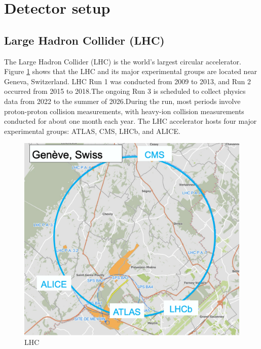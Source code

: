\newpage
\clearpage
\section{Detector setup}
    \subsection{Large Hadron Collider (LHC)}
        The Large Hadron Collider (LHC) is the world's largest circular accelerator. Figure \ref{LHC} shows that the LHC and its major experimental groups are located near Geneva, Switzerland. LHC Run 1 was conducted from 2009 to 2013, and Run 2 occurred from 2015 to 2018.\@ The ongoing Run 3 is scheduled to collect physics data from 2022 to the summer of 2026.\@ During the run, most periods involve proton-proton collision measurements, with heavy-ion collision measurements conducted for about one month each year. The LHC accelerator hosts four major experimental groups: ATLAS, CMS, LHCb, and ALICE.\@
        \begin{figure}[htbp]
            \centering
            \includegraphics[keepaspectratio, scale=0.2]{fig/2_1_LHC_detecter.png}
            \caption{LHC}
            \label{LHC}
        \end{figure}

